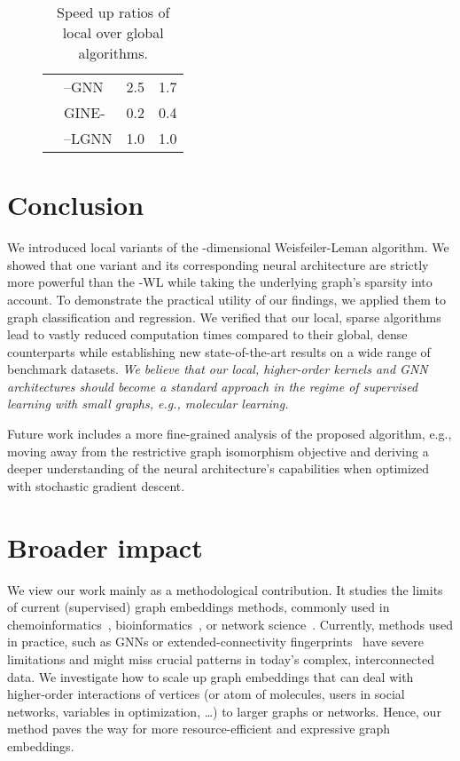 \documentclass{article}
\theoremstyle{definition}
\newcommand{\kwl}{-\textsf{WL}\xspace}
\newcommand{\gineeps}{\textsf{GINE-}\xspace}
\begin{document}
\begin{table}
\begin{center}
\begin{subfigure}[c,top]{0.48\textwidth}
{\begin{tabular}{@{}c<{\enspace}@{}lcc@{}}
					& \textsf{--GNN}                     &          2.5          &           1.7            \\
					\cmidrule{2-4}      
					& \gineeps                                 &          0.2          &           0.4            \\
					& \textsf{--LGNN}                      &          1.0          &           1.0            \\ \bottomrule
			\end{tabular}}
			\vspace{0pt}
		\end{subfigure}
	\end{center}
	\caption{Speed up ratios of local over global algorithms.}\label{add}
\end{table}
\section{Conclusion}
We introduced local variants of the -dimensional Weisfeiler-Leman algorithm. We showed that one variant and its corresponding neural architecture are strictly more powerful than the \kwl while taking the underlying graph's sparsity into account. To demonstrate the practical utility of our findings, we applied them to graph classification and regression. We verified that our local, sparse algorithms lead to vastly reduced computation times compared to their global, dense counterparts while establishing new state-of-the-art results on a wide range of benchmark datasets. \emph{We believe that our local, higher-order kernels and GNN architectures should become a standard approach in the regime of supervised learning with small graphs, e.g., molecular learning.} 

Future work includes a more fine-grained analysis of the proposed algorithm, e.g., moving away from the restrictive graph isomorphism objective and deriving a deeper understanding of the neural architecture's capabilities when optimized with stochastic gradient descent.

 

\section*{Broader impact}
We view our work mainly as a methodological contribution. It studies the limits of current (supervised) graph embeddings methods, commonly used in chemoinformatics~\cite{Sto+2020}, bioinformatics~\cite{Barabasi2004}, or network science~\cite{Eas+2010}. Currently, methods used in practice, such as GNNs or extended-connectivity fingerprints~\cite{Rogers2010} have severe limitations and might miss crucial patterns in today's complex, interconnected data. We investigate how to scale up graph embeddings that can deal with higher-order interactions of vertices (or atom of molecules, users in social networks, variables in optimization, \dots) to larger graphs or networks.  Hence, our method paves the way for more resource-efficient and expressive graph embeddings.
\end{document}
